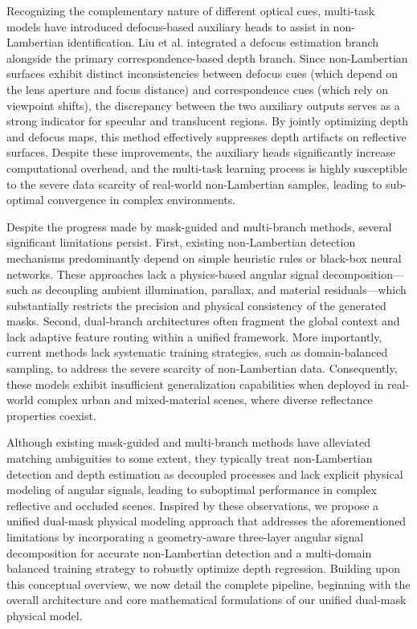 \documentclass[lettersize,journal]{IEEEtran}
\begin{document}
Recognizing the complementary nature of different optical cues, multi-task models have introduced defocus-based auxiliary heads to assist in non-Lambertian identification. Liu et al. \cite{syntacdeno} integrated a defocus estimation branch alongside the primary correspondence-based depth branch. Since non-Lambertian surfaces exhibit distinct inconsistencies between defocus cues (which depend on the lens aperture and focus distance) and correspondence cues (which rely on viewpoint shifts), the discrepancy between the two auxiliary outputs serves as a strong indicator for specular and translucent regions. By jointly optimizing depth and defocus maps, this method effectively suppresses depth artifacts on reflective surfaces. Despite these improvements, the auxiliary heads significantly increase computational overhead, and the multi-task learning process is highly susceptible to the severe data scarcity of real-world non-Lambertian samples, leading to sub-optimal convergence in complex environments.

Despite the progress made by mask-guided and multi-branch methods, several significant limitations persist. First, existing non-Lambertian detection mechanisms predominantly depend on simple heuristic rules or black-box neural networks. These approaches lack a physics-based angular signal decomposition—such as decoupling ambient illumination, parallax, and material residuals—which substantially restricts the precision and physical consistency of the generated masks. Second, dual-branch architectures often fragment the global context and lack adaptive feature routing within a unified framework. More importantly, current methods lack systematic training strategies, such as domain-balanced sampling, to address the severe scarcity of non-Lambertian data. Consequently, these models exhibit insufficient generalization capabilities when deployed in real-world complex urban and mixed-material scenes, where diverse reflectance properties coexist.

Although existing mask-guided and multi-branch methods have alleviated matching ambiguities to some extent, they typically treat non-Lambertian detection and depth estimation as decoupled processes and lack explicit physical modeling of angular signals, leading to suboptimal performance in complex reflective and occluded scenes. Inspired by these observations, we propose a unified dual-mask physical modeling approach that addresses the aforementioned limitations by incorporating a geometry-aware three-layer angular signal decomposition for accurate non-Lambertian detection and a multi-domain balanced training strategy to robustly optimize depth regression. Building upon this conceptual overview, we now detail the complete pipeline, beginning with the overall architecture and core mathematical formulations of our unified dual-mask physical model.
\end{document}

